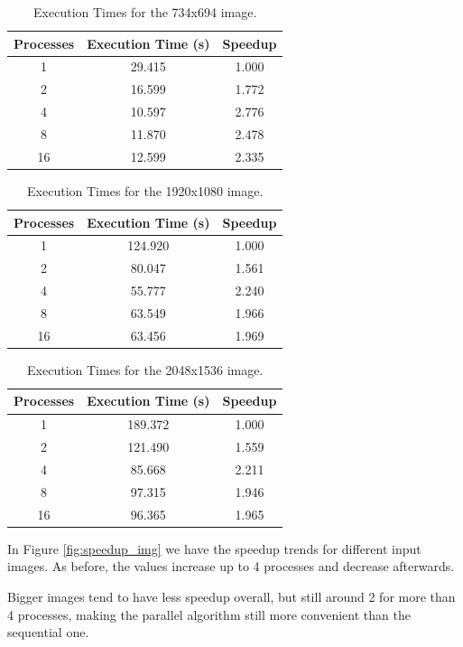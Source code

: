 \documentclass[10pt,twocolumn,letterpaper]{article}
\begin{document}
\begin{table}[H]
	\begin{center}
		\begin{tabular}{|c|c|c|}
			\hline
			Processes & Execution Time (s) & Speedup \\
			\hline
			1 & 29.415 & 1.000 \\
			2 & 16.599 & 1.772 \\
			4 & 10.597 & 2.776 \\
			8 & 11.870 & 2.478 \\
			16 & 12.599 & 2.335 \\
			\hline
		\end{tabular}
	\end{center}
	\caption{Execution Times for the 734x694 image.}
	\label{tab:speedup_k_i_2}
\end{table}

\begin{table}[H]
	\begin{center}
		\begin{tabular}{|c|c|c|}
			\hline
			Processes & Execution Time (s) & Speedup \\
			\hline
			1 & 124.920 & 1.000 \\
			2 & 80.047 & 1.561 \\
			4 & 55.777 & 2.240 \\
			8 & 63.549 & 1.966 \\
			16 & 63.456 & 1.969 \\
			\hline
		\end{tabular}
	\end{center}
	\caption{Execution Times for the 1920x1080 image.}
	\label{tab:speedup_i_3}
\end{table}

\begin{table}[H]
	\begin{center}
		\begin{tabular}{|c|c|c|}
			\hline
			Processes & Execution Time (s) & Speedup \\
			\hline
			1 & 189.372 & 1.000 \\
			2 & 121.490 & 1.559 \\
			4 & 85.668 & 2.211 \\
			8 & 97.315 & 1.946 \\
			16 & 96.365 & 1.965 \\
			\hline
		\end{tabular}
	\end{center}
	\caption{Execution Times for the 2048x1536 image.}
	\label{tab:speedup_i_4}
\end{table}

In Figure \ref{fig:speedup_img} we have the speedup trends for different input images. As before, the values increase up to 4 processes and decrease afterwards.

Bigger images tend to have less speedup overall, but still around 2 for more than 4 processes, making the parallel algorithm still more convenient than the sequential one.
\end{document}
